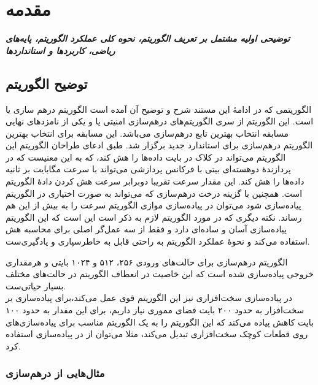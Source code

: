 \chapter{مقدمه}
\noindent
\textbf{
\textit{
توضیحی اولیه مشتمل بر تعریف الگوریتم، نحوه کلی عملکرد الگوریتم، پایه‌های ریاضی، کاربردها و استانداردها
}
}
\pagebreak
\section{توضیح الگوریتم}
\par
الگوریتمی که در ادامهٔ این مستند شرح و توضیح آن آمده است الگوریتم درهم سازی 
یا 
است. این الگوریتم از سری الگوریتم‌های درهم‌سازی امنیتی یا 
 و یکی از نامزدهای نهایی مسابقه انتخاب بهترین تابع درهم‌سازی 
 می‌باشد. این مسابقه برای انتخاب بهترین الگوریتم در‌هم‌سازی برای استاندارد جدید 
 برگزار شد. 
 طبق ادعای طراحان الگوریتم این الگوریتم می‌تواند در 
 کلاک در بایت داده‌ها را هش کند، که به این معنیست که در پردازندهٔ دوهسته‌ای
  بیتی با فرکانس پردازشی
    می‌تواند با سرعت 
  مگابایت بر ثانیه داده‌ها را هش کند. این مقدار سرعت تقریبا دوبرابر سرعت هش کردن دادهٔ الگوریتم 
  است. همچنین با گزینه درخت درهم‌سازی که می‌تواند به صورت اختیاری در الگوریتم پیاده‌سازی شود می‌توان 	در پیاده‌سازی موازی الگوریتم سرعت را به بیش از این هم رساند. نکته دیگری که در مورد الگوریتم 
  لازم به ذکر است این است که این الگوریتم پیاده‌سازی آسان و ساده‌ای دارد و فقط از سه عمل‌گر اصلی برای محاسبه هش استفاده می‌کند و نحوهٔ عملکرد الگوریتم به راحتی قابل به خاطرسپاری و یادگیری‌ست. 
  \par
  الگوریتم درهم‌سازی
  برای حالت‌های ورودی ۲۵۶، ۵۱۲ و ۱۰۲۴ بایتی و هرمقداری خروجی پیاده‌سازی شده است که این خاصیت در انعطاف الگوریتم در حالت‌های مختلف بسیار حیاتی‌ست. 
  \\
  در پیاده‌سازی سخت‌افزاری نیز این الگوریتم قوی عمل می‌کند،‌برای پیاده‌سازی 
  بر سخت‌افزار به حدود ۲۰۰ بایت فضای مموری نیاز داریم، برای 
  این مفدار به حدود ۱۰۰ بایت کاهش پیاده می‌کند که این الگوریتم را به یک الگوریتم مناسب برای پیاده‌سازی‌های روی قطعات کوچک سخت‌افزاری تبدیل می‌کند، مثلا می‌توان از 
  در پیاده‌سازی 
  استفاده کرد.
  \cite{skein}
 
  
  \subsection{مثال‌هایی از درهم‌سازی}

